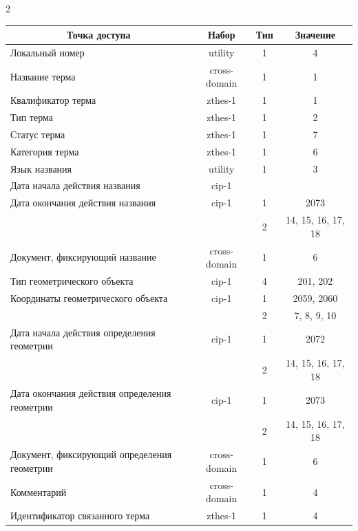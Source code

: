 \begin{multicols}{2}
\begin{table}
\begin{center}
\begin{tabular}{|l|c|c|c|}
\multicolumn{1}{|c|}{Точка доступа}&Набор&Тип&Значение\\

\hline

Локальный номер&{utility}&1&4\\

Название терма&{cross-domain}&1&1\\

Квалификатор терма&{zthes-1}&1&1\\

Тип терма&{zthes-1}&1&2\\

Статус терма&{zthes-1}&1&7\\

Категория терма&{zthes-1}&1&6\\

Язык названия&{utility}&1&3\\

Дата начала действия названия&{cip-1}&&\\

Дата окончания действия названия&{cip-1}&1&2073\\

&&2&14, 15, 16, 17, 18\\

Документ, фиксирующий название&{cross-domain}&1&6\\

Тип геометрического объекта&{cip-1}&4&201, 202\\

Координаты геометрического объекта&{cip-1}&1&2059, 2060\\

&&2&7, 8, 9, 10\\

Дата начала действия определения геометрии&{cip-1}&1&2072\\

&&2&14, 15, 16, 17, 18\\

Дата окончания действия определения геометрии&{cip-1}&1&2073\\

&&2&14, 15, 16, 17, 18\\

Документ, фиксирующий определения геометрии&{cross-domain}&1&6\\

Комментарий&{cross-domain}&1&4\\

Идентификатор связанного терма&{zthes-1}&1&4\\


\end{tabular}
\end{center}
\end{table}
\end{multicols}
